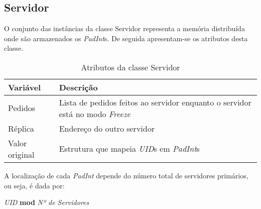 \subsection{Servidor}
O conjunto das instâncias da classe Servidor representa a memória distribuída onde são armazenados os \textit{PadInt}s. De seguida apresentam-se os atributos desta classe.
\begin{table}[H]
\centering
\begin{tabular}{| p{2cm} | p{5cm} |}
\hline
\textbf{Variável} & \textbf{Descrição} \\
\hline
Pedidos & Lista de pedidos feitos ao servidor enquanto o servidor está no modo \textit{Freeze} \\
\hline
Réplica & Endereço do outro servidor \\
\hline
Valor original & Estrutura que mapeia \textit{UID}s em \textit{PadInt}s \\
\hline
\end{tabular}
\caption{Atributos da classe Servidor}
\end{table}

A localização de cada \textit{PadInt} depende do número total de servidores primários, ou seja, é dada por:

\centerline{\textit{UID} \textbf{mod}  \textit{Nº de Servidores}}